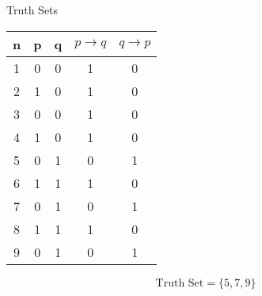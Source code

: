 \documentclass{beamer}
\begin{document}
\begin{frame}
{Truth Sets}

\begin{center}
\begin{tabular}{|c||c|c||c||c|}
\hline \phantom{sp} n \phantom{sp} & \phantom{sp} p \phantom{sp} & \phantom{sp}q \phantom{sp}& \phantom{s} $  p \rightarrow q$ \phantom{s}& \phantom{s} $q \rightarrow p$ \phantom{s}\\  \hline
\hline 1 & 0 & 0 & 1 & 0\\ 
\hline 2 & 1 & 0 & 1 & 0\\ 
\hline 3 & 0 & 0 & 1 & 0\\ 
\hline 4 & 1 & 0 & 1 & 0\\ 
\hline 5 & 0 & 1 & 0 & 1\\ 
\hline 6 & 1 & 1 & 1 & 0\\ 
\hline 7 & 0 & 1 & 0 & 1\\ 
\hline 8 & 1 & 1 & 1 & 0\\ 
\hline 9 & 0 & 1 & 0 & 1\\ 
\hline 
\end{tabular} 
\end{center}
\[\mbox{Truth Set} = \{5,7,9\}\]
\end{frame}

\end{document}
